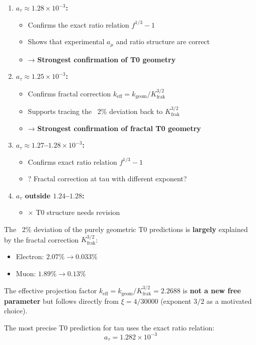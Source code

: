 	\begin{enumerate}
		\item \textbf{$a_\tau \approx 1.28 \times 10^{-3}$:}
		\begin{itemize}
			\item \checkmark{} Confirms the exact ratio relation $f^{1/3} - 1$
			\item \checkmark{} Shows that experimental $a_\mu$ and ratio structure are correct
			\item → \textbf{Strongest confirmation of T0 geometry}
		\end{itemize}
		
		\item \textbf{$a_\tau \approx 1.25 \times 10^{-3}$:}
		\begin{itemize}
			\item \checkmark{} Confirms fractal correction $k_{\text{eff}} = k_\text{geom}/K_\text{frak}^{3/2}$
			\item \checkmark{} Supports tracing the ~2\% deviation back to $K_\text{frak}^{3/2}$
			\item → \textbf{Strongest confirmation of fractal T0 geometry}
		\end{itemize}
		
		\item \textbf{$a_\tau \approx 1.27$--$1.28 \times 10^{-3}$:}
		\begin{itemize}
			\item \checkmark{} Confirms exact ratio relation $f^{1/3} - 1$
			\item ? Fractal correction at tau with different exponent?
		\end{itemize}
		
		\item \textbf{$a_\tau$ outside $1.24$--$1.28$:}
		\begin{itemize}
			\item $\times$ T0 structure needs revision
		\end{itemize}
	\end{enumerate}
	
	\begin{keypoint}
		The ~2\% deviation of the purely geometric T0 predictions is \textbf{largely} explained by the fractal correction $K_\text{frak}^{3/2}$:
		\begin{itemize}
			\item Electron: $2.07\% \to 0.033\%$
			\item Muon: $1.89\% \to 0.13\%$
		\end{itemize}
		
		The effective projection factor $k_\text{eff} = k_\text{geom}/K_\text{frak}^{3/2} = 2.2688$ is \textbf{not a new free parameter} but follows directly from $\xi = 4/30000$ (exponent $3/2$ as a motivated choice).
		
		The most precise T0 prediction for tau uses the exact ratio relation:
		\begin{equation}
			\boxed{a_\tau = 1.282 \times 10^{-3}}
		\end{equation}
	\end{keypoint}
	
